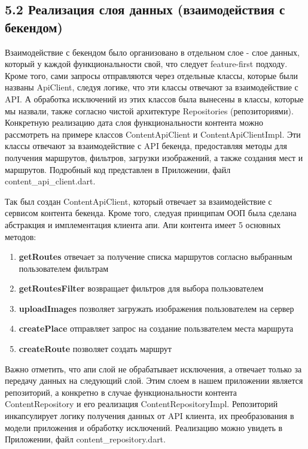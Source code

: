 \subsection*{5.2 Реализация слоя данных (взаимодействия с бекендом)}
Взаимодействие с бекендом было организовано в отдельном слое - слое данных, который у каждой функциональности свой, что следует feature-first подходу. Кроме того, сами запросы отправляются через отдельные классы, которые были названы ApiClient, следуя логике, что эти классы отвечают за взаимодействие с API. А обработка исключений из этих классов была вынесены в классы, которые мы назвали, также согласно чистой архитектуре Repositories (репозиториями). Конкретную реализацию дата слоя функциональности контента можно рассмотреть на примере классов ContentApiClient и ContentApiClientImpl. Эти классы отвечают за взаимодействие с API бекенда, предоставляя методы для получения маршрутов, фильтров, загрузки изображений, а также создания мест и маршрутов. Подробный код представлен в Приложении, файл content\_api\_client.dart.

Так был создан ContentApiClient, который отвечает за взаимодействие с сервисом контента бекенда. Кроме того, следуая принципам ООП была сделана абстракция и имплементация клиента апи. Апи контента имеет 5 основных методов:

\begin{enumerate}
    \item \textbf{getRoutes} отвечает за получение списка маршрутов согласно выбранным пользователем фильтрам
    \item \textbf{getRoutesFilter} возвращает фильтров для выбора пользователем
    \item \textbf{uploadImages} позволяет загружать изображения пользователем на сервер
    \item \textbf{createPlace} отправляет запрос на создание пользвателем места маршрута
    \item \textbf{createRoute} позволяет создать маршрут
\end{enumerate}

Важно отметить, что апи слой не обрабатывает исключения, а отвечает только за передачу данных на следующий слой. Этим слоем в нашем приложении является репозиторий, а конкретно в случае функциональности контента ContentRepository и его реализация ContentRepositoryImpl. Репозиторий инкапсулирует логику получения данных от API клиента, их преобразования в модели приложения и обработку исключений. Реализацию можно увидеть в Приложении, файл content\_repository.dart.

